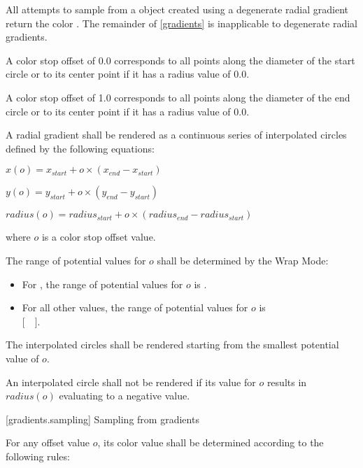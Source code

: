 \pnum
All attempts to sample from a  object created using a degenerate radial gradient return the color . The remainder of \ref{gradients} is inapplicable to degenerate radial gradients.

\pnum
A color stop offset of 0.0 corresponds to all points along the diameter of the start circle or to its center point if it has a radius value of 0.0.

\pnum
A color stop offset of 1.0 corresponds to all points along the diameter of the end circle or to its center point if it has a radius value of 0.0.

\pnum
A radial gradient shall be rendered as a continuous series of interpolated circles defined by the following equations:
\begin{enumeratea}
\item $x(o) = x_{start} + o \times (x_{end} - x_{start})$
\item $y(o) = y_{start} + o \times (y_{end} - y_{start})$
\item $radius(o) = radius_{start} + o \times (radius_{end} - radius_{start})$
\end{enumeratea}
where $o$ is a color stop offset value.

\pnum
The range of potential values for $o$ shall be determined by the Wrap Mode:
\begin{itemize}
\item For , the range of potential values for $o$ is .
\item For all other  values, the range of potential values for $o$ is\\ $[$~~$]$.
\end{itemize}

\pnum
The interpolated circles shall be rendered starting from the smallest potential value of $o$.

\pnum
An interpolated circle shall not be rendered if its value for $o$ results in $radius(o)$ evaluating to a negative value.

 [gradients.sampling] {Sampling from gradients}

\pnum
For any offset value $o$, its color value shall be determined according to the following rules:

